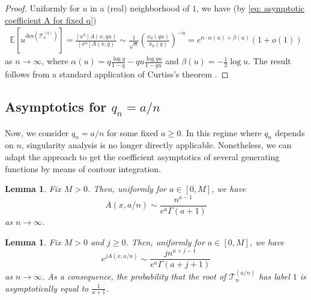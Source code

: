 \documentclass{article}
\newtheorem{lemma}[theorem]{Lemma}
\theoremstyle{remark}
\newcommand{\cT}{\mathcal{T}}
\newcommand{\expec}[1]{\mathbb{E}{\left[#1\right]}}
\newcommand{\des}[1]{{\mathrm{des}{\left(#1\right)}}}
\begin{document}
\begin{proof}
    Uniformly for $u$ in a (real) neighborhood of $1$, we have (by \eqref{eq: asymptotic coefficient A for fixed q})
    \begin{align*}
        \expec{u^{\des{\cT_n^{(q)}}}}
        = \frac{[x^n] A(x,qu)}{[x^n] A(x,q)}
        \sim \frac{1}{\sqrt u} \left( \frac{x_0(qu)}{x_0(q)} \right)^{-n}
        = e^{n\cdot \alpha(u) + \beta(u)} ( 1 + o(1) )
    \end{align*}
    as $n\to\infty$, where $\alpha(u) = q\frac{\log q}{1-q} - qu\frac{\log qu}{1-qu}$ and $\beta(u) = -\frac{1}{2}\log u$.
    The result follows from a standard application of Curtiss's theorem \cite{Curtiss_1942}.%
\end{proof}


\subsection{Asymptotics for $q_n=a/n$}
\label{sec: Asymptotics for q=a/n}

Now, we consider $q_n = a/n$ for some fixed $a\ge0$.
In this regime where $q_n$ depends on $n$, singularity analysis is no longer directly applicable.
Nonetheless, we can adapt the approach to get the coefficient asymptotics of several generating functions by means of contour integration.

\begin{lemma}\label{lem: asymptotic coefficient partition function in transition regime}
    Fix $M>0$.
    Then, uniformly for $a\in[0,M]$, we have
    \begin{equation*}
        [x^n] A(x,a/n) \sim \frac{n^{a-1}}{e^a \Gamma(a+1)}
    \end{equation*}
    as $n\to\infty$.
\end{lemma}

\begin{lemma}\label{lem: asymptotic coefficient exponentials in transition regime}
    Fix $M>0$ and $j\ge0$.
    Then, uniformly for $a\in[0,M]$, we have
    \begin{equation*}
        [x^n] e^{j A(x,a/n)} \sim  \frac{j n^{a+j-1}}{e^{a} \Gamma(a+j+1)}
    \end{equation*}
    as $n\to\infty$.
    As a consequence, the probability that the root of $\cT_n^{(a/n)}$ has label $1$ is asymptotically equal to $\frac{1}{a+1}$.
\end{lemma}
\end{document}
